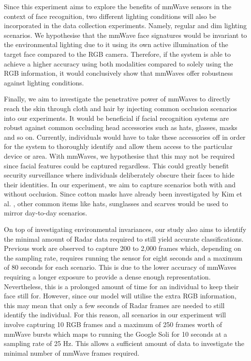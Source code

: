 \documentclass{interim}
\begin{document}
Since this experiment aims to explore the benefits of mmWave sensors in the context of face recognition, two different lighting conditions will also be incorporated in the data collection experiments. Namely, regular and dim lighting scenarios. We hypothesise that the mmWave face signatures would be invariant to the environmental lighting due to it using its own active illumination of the target face compared to the RGB camera. Therefore, if the system is able to achieve a higher accuracy using both modalities compared to solely using the RGB information, it would conclusively show that mmWaves offer robustness against lighting conditions.

Finally, we aim to investigate the penetrative power of mmWaves to directly reach the skin through cloth and hair by injecting common occlusion scenarios into our experiments. It would be beneficial if facial recognition systems are robust against common occluding head accessories such as hats, glasses, masks and so on. Currently, individuals would have to take these accessories off in order for the system to thoroughly identify and allow them access to the particular device or area. With mmWaves, we hypothesise that this may not be required since facial features could be captured regardless. This could greatly benefit security surveillance where individuals deliberately obscure their faces to hide their identities. In our experiment, we aim to capture scenarios both with and without occlusion. Since cotton masks have already been investigated by Kim et al. \cite{kim2020face}, other common items like hats, sunglasses and scarves would be used to mirror day-to-day scenarios.

On top of investigating environmental invariances, our study also aims to identify the minimal amount of Radar data required to still yield accurate classifications. Previous work are observed to capture 200 to 2,000 frames which, depending on the sampling rate, requires running the sensor for eight seconds and a maximum of 80 seconds for each scenario. This is due to the lower accuracy of mmWaves requiring a longer exposure to provide a dense enough representation. Nevertheless, this is a prolonged amount of time for an individual to keep their face still for. However, since our model will utilise the extra RGB information, this may mean that only a few seconds of Radar frames are needed to still identify the individual. For this reason, all scenarios in our experiment will involve capturing 10 RGB frames and a maximum of 250 frames worth of mmWave bursts which maps to running the Google Soli for 10 seconds at a sampling rate of 25 Hz. This allows a sufficient amount of data to investigate the minimal number of mmWave frames required.
\end{document}
